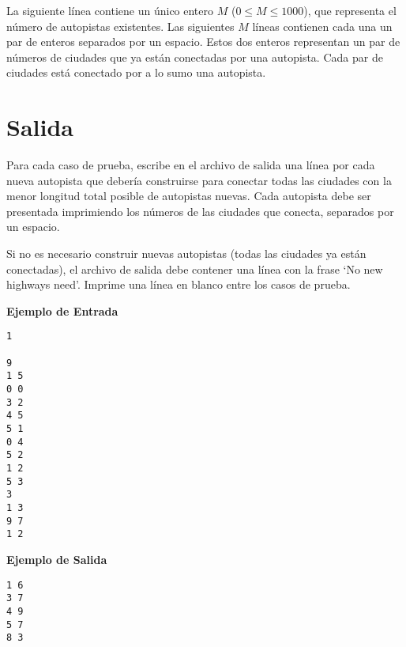 La siguiente línea contiene un único entero \(M\) (\(0 \leq M \leq 1000\)), que representa
el número de autopistas existentes. Las siguientes \(M\) líneas contienen cada una un par
de enteros separados por un espacio. Estos dos enteros representan un par de números de
ciudades que ya están conectadas por una autopista. Cada par de ciudades está conectado
por a lo sumo una autopista.

\section*{Salida}

Para cada caso de prueba, escribe en el archivo de salida una línea por cada nueva
autopista que debería construirse para conectar todas las ciudades con la menor longitud
total posible de autopistas nuevas. Cada autopista debe ser presentada imprimiendo los
números de las ciudades que conecta, separados por un espacio.

Si no es necesario construir nuevas autopistas (todas las ciudades ya están conectadas),
el archivo de salida debe contener una línea con la frase ‘No new highways need’.  Imprime
una línea en blanco entre los casos de prueba.

\textbf{Ejemplo de Entrada}
\begin{verbatim}
1

9
1 5
0 0
3 2
4 5
5 1
0 4
5 2
1 2
5 3
3
1 3
9 7
1 2
\end{verbatim}

\textbf{Ejemplo de Salida}
\begin{verbatim}
1 6
3 7
4 9
5 7
8 3
\end{verbatim}
